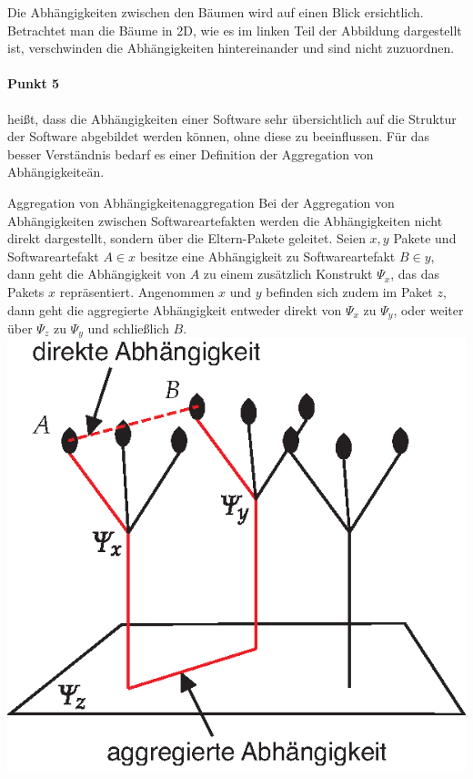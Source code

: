 Die Abhängigkeiten zwischen den Bäumen wird auf einen Blick ersichtlich. Betrachtet man die Bäume in 2D, wie es im linken Teil der Abbildung dargestellt ist, verschwinden die Abhängigkeiten hintereinander und sind nicht zuzuordnen.

\paragraph{Punkt 5} heißt, dass die Abhängigkeiten einer Software sehr übersichtlich auf die Struktur der Software abgebildet werden können, ohne diese zu beeinflussen. Für das besser Verständnis bedarf es einer Definition der Aggregation von Abhängigkeiteän.

\begin{splitbox}{Aggregation von Abhängigkeiten}{aggregation}
Bei der Aggregation von Abhängigkeiten zwischen Softwareartefakten werden die Abhängigkeiten nicht direkt dargestellt, sondern über die Eltern-Pakete geleitet. Seien $x, y$ Pakete und Softwareartefakt $A \in x$ besitze eine Abhängigkeit zu Softwareartefakt $B \in y$, dann geht die Abhängigkeit von $A$ zu einem zusätzlich Konstrukt $\Psi_x$, das das Pakets $x$ repräsentiert. Angenommen $x$ und $y$ befinden sich zudem im Paket $z$, dann geht die aggregierte Abhängigkeit entweder direkt von $\Psi_x$ zu $\Psi_y$, oder weiter über $\Psi_z$ zu $\Psi_y$ und schließlich $B$.
\tcblower
\includegraphics[width=\linewidth]{figures/aggregation}
\end{splitbox}

